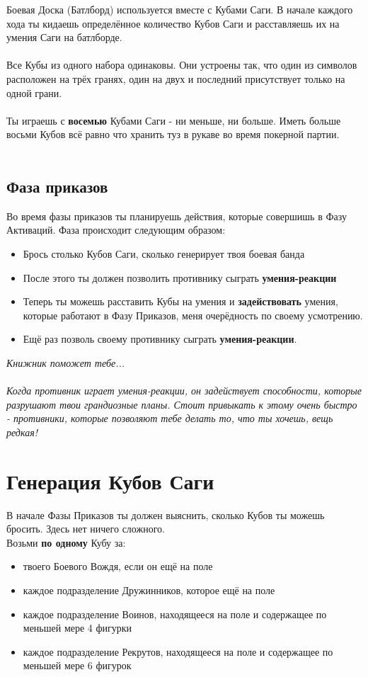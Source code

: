 \documentclass[a4paper,11pt,twoside]{article}
\begin{document}
Боевая Доска (Батлборд) используется вместе с Кубами Саги. В начале каждого хода ты кидаешь определённое количество Кубов Саги и расставляешь их на умения Саги на батлборде. \\ \\ 
Все Кубы из одного набора одинаковы. Они устроены так, что один из символов расположен на трёх гранях, один на двух и последний присутствует только на одной грани. \\ \\ 
Ты играешь с \textbf{восемью} Кубами Саги - ни меньше, ни больше. Иметь больше восьми Кубов всё равно что хранить туз в рукаве во время покерной партии. \\ \\ 
\subsection*{Фаза приказов}
Во время фазы приказов ты планируешь действия, которые совершишь в Фазу Активаций. Фаза происходит следующим образом:
\begin{itemize}
\item Брось столько Кубов Саги, сколько генерирует твоя боевая банда
\item После этого ты должен позволить противнику сыграть \textbf{умения-реакции}
\item Теперь ты можешь расставить Кубы на умения и \textbf{задействовать} умения, которые работают в Фазу Приказов, меня очерёдность по своему усмотрению.
\item Ещё раз позволь своему противнику сыграть \textbf{умения-реакции}.
\end{itemize}

\begingroup
\fontsize{15pt}{11pt}\selectfont
\textit{Книжник поможет тебе...}\\ \\
\fontsize{11pt}{11pt}\selectfont
\textit{Когда противник играет умения-реакции, он задействует способности, которые разрушают твои грандиозные планы. Стоит привыкать к этому очень быстро - противники, которые позволяют тебе делать то, что ты хочешь, вещь редкая!}
\endgroup 

\section*{Генерация Кубов Саги}

В начале Фазы Приказов ты должен выяснить, сколько Кубов ты можешь бросить. Здесь нет ничего сложного. \\
Возьми \textbf{по одному} Кубу за:
\begin{itemize}
\item твоего Боевого Вождя, если он ещё на поле
\item каждое подразделение Дружинников, которое ещё на поле
\item каждое подразделение Воинов, находящееся на поле и содержащее по меньшей мере 4 фигурки
\item каждое подразделение Рекрутов, находящееся на поле и содержащее по меньшей мере 6 фигурок
\end{itemize}
\end{document}
